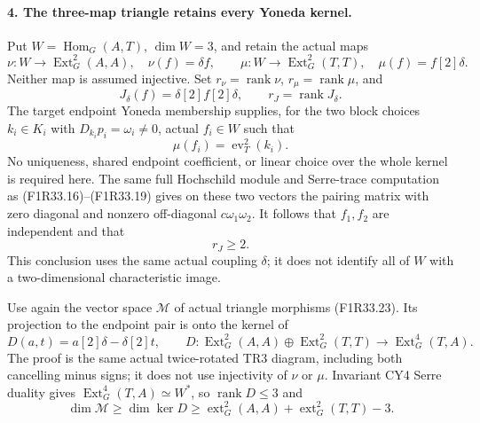 \paragraph{4. The three-map triangle retains every Yoneda kernel.}
Put $W=\operatorname{Hom}_G(A,T)$,
$\dim W=3$, and retain the actual
maps
\[
 \nu:W\to\operatorname{Ext}^2_G(A,A),\quad\nu(f)=\delta f,
 \qquad
 \mu:W\to\operatorname{Ext}^2_G(T,T),\quad\mu(f)=f[2]\delta.
 \tag{F1R34.21}
\]
Neither map is assumed injective.
Set $r_\nu=\operatorname{rank}\nu$,
$r_\mu=\operatorname{rank}\mu$, and
\[
 J_\delta(f)=\delta[2]f[2]\delta,
            \qquad r_J=\operatorname{rank}J_\delta.
 \tag{F1R34.22}
\]
The target endpoint Yoneda membership
supplies, for the two block choices
$k_i\in K_i$ with $D_{k_i}p_i=
\omega_i\ne0$, actual $f_i\in W$
such that
\[
                        \mu(f_i)=\operatorname{ev}_T^2(k_i).
 \tag{F1R34.23}
\]
No uniqueness, shared endpoint
coefficient, or linear choice over
the whole kernel is required here.
The same full Hochschild module and
Serre-trace computation as
(F1R33.16)--(F1R33.19) gives on
these two vectors the pairing
matrix with zero diagonal and
nonzero off-diagonal
$c\omega_1\omega_2$. It follows
that $f_1,f_2$ are independent
and that
\[
                              r_J\ge2.
 \tag{F1R34.24}
\]
This conclusion uses the same
actual coupling $\delta$; it does
not identify all of $W$ with a
two-dimensional characteristic
image.

Use again the vector space
$\mathcal M$ of actual triangle
morphisms (F1R33.23). Its projection
to the endpoint pair is onto the
kernel of
\[
 D(a,t)=a[2]\delta-\delta[2]t,
 \qquad
 D:\operatorname{Ext}^2_G(A,A)\oplus
       \operatorname{Ext}^2_G(T,T)
                       \longrightarrow\operatorname{Ext}^4_G(T,A).
 \tag{F1R34.25}
\]
The proof is the same actual
twice-rotated TR3 diagram, including
both cancelling minus signs; it
does not use injectivity of
$\nu$ or $\mu$.
Invariant CY4 Serre duality gives
$\operatorname{Ext}^4_G(T,A)\simeq W^*$,
so $\operatorname{rank}D\le3$ and
\[
 \dim\mathcal M\ge\dim\ker D
       \ge\operatorname{ext}^2_G(A,A)
            +\operatorname{ext}^2_G(T,T)-3.
 \tag{F1R34.26}
\]

